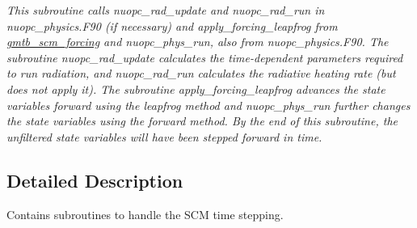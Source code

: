 \begin{DoxyCompactItemize}
\begin{DoxyCompactList}\small\item\em This subroutine calls nuopc\+\_\+rad\+\_\+update and nuopc\+\_\+rad\+\_\+run in nuopc\+\_\+physics.\+F90 (if necessary) and apply\+\_\+forcing\+\_\+leapfrog from \hyperlink{group__forcing}{gmtb\+\_\+scm\+\_\+forcing} and nuopc\+\_\+phys\+\_\+run, also from nuopc\+\_\+physics.\+F90. The subroutine nuopc\+\_\+rad\+\_\+update calculates the time-\/dependent parameters required to run radiation, and nuopc\+\_\+rad\+\_\+run calculates the radiative heating rate (but does not apply it). The subroutine apply\+\_\+forcing\+\_\+leapfrog advances the state variables forward using the leapfrog method and nuopc\+\_\+phys\+\_\+run further changes the state variables using the forward method. By the end of this subroutine, the unfiltered state variables will have been stepped forward in time. \end{DoxyCompactList}\end{DoxyCompactItemize}



\subsection{Detailed Description}
Contains subroutines to handle the S\+CM time stepping. 

